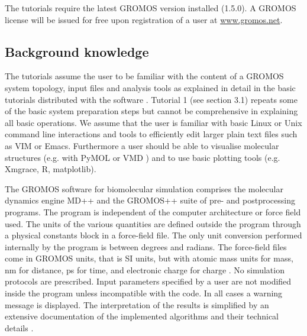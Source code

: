The tutorials require the latest GROMOS version installed (1.5.0). A GROMOS license will be issued for free upon registration of a user at \url{www.gromos.net}.  

\subsection{Background knowledge}
%
The tutorials assume the user to be familiar with the content of a GROMOS system topology, input files and analysis tools as explained in detail in the basic tutorials distributed with the software \cite{volume_7}. 
Tutorial 1 (see section 3.1) repeats some of the basic system preparation steps but cannot be comprehensive in explaining all basic operations. We assume that the user is familiar with basic Linux or Unix 
command line interactions and tools to efficiently edit larger plain text files such as VIM or Emacs. Furthermore a user should be able to visualise molecular structures (e.g. with PyMOL \cite{pymol} or VMD \cite{HUMP96}) 
and to use basic plotting tools (e.g. Xmgrace, R, matplotlib).  

The GROMOS software for biomolecular simulation comprises the molecular dynamics engine MD++ and the \linebreak GROMOS++ suite of pre- and postprocessing programs. The program is independent of the computer architecture or force field used. 
The units of the various quantities are defined outside the program through a physical constants block in a force-field file. The only unit conversion performed internally by the program is between degrees and radians. The force-field files come 
in GROMOS units, that is SI units, but with atomic mass units for mass, nm for distance, ps for time, and electronic charge for charge \cite{volume_6}. No simulation protocols are prescribed. Input parameters specified by a user are not modified inside 
the program unless incompatible with the code. In all cases a warning message is displayed. The interpretation of the results is simplified by an extensive documentation of the implemented algorithms and their technical details \cite{volume_6,volume_2}.


